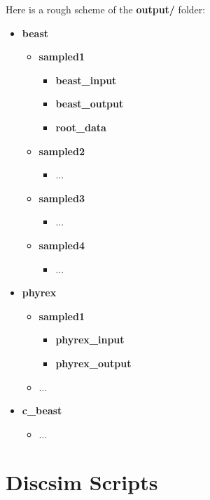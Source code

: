 Here is a rough scheme of the \textbf{output/} folder:
\begin{itemize}
\item \textbf{beast}
\begin{itemize}
\item \textbf{sampled1}
\begin{itemize}
\item \textbf{beast\_input}
\item \textbf{beast\_output}
\item \textbf{root\_data}
\end{itemize}
\item \textbf{sampled2}
\begin{itemize}
\item ...
\end{itemize}
\item \textbf{sampled3}
\begin{itemize}
\item ...
\end{itemize}
\item \textbf{sampled4}
\begin{itemize}
\item ...
\end{itemize}
\end{itemize}

\item \textbf{phyrex}
\begin{itemize}
\item \textbf{sampled1}
\begin{itemize}
\item \textbf{phyrex\_input}
\item \textbf{phyrex\_output}
\end{itemize}
\item ...

\end{itemize}

\item \textbf{c\_beast}
\begin{itemize}
\item ...
\end{itemize}





\end{itemize}

\clearpage

\section*{Discsim Scripts}

